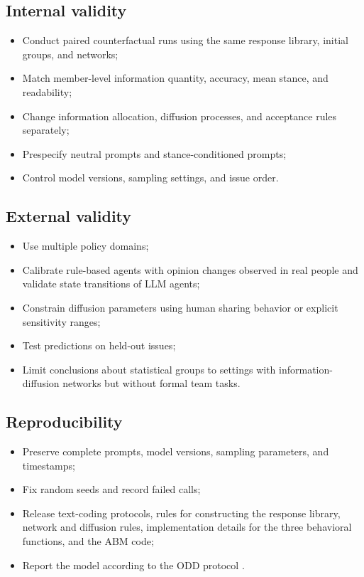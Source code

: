 \documentclass[11pt,a4paper]{article}
\begin{document}
\subsection{Internal validity}

\begin{itemize}
\item Conduct paired counterfactual runs using the same response library, initial groups, and networks;
\item Match member-level information quantity, accuracy, mean stance, and readability;
\item Change information allocation, diffusion processes, and acceptance rules separately;
\item Prespecify neutral prompts and stance-conditioned prompts;
\item Control model versions, sampling settings, and issue order.
\end{itemize}

\subsection{External validity}

\begin{itemize}
\item Use multiple policy domains;
\item Calibrate rule-based agents with opinion changes observed in real people and validate state transitions of LLM agents;
\item Constrain diffusion parameters using human sharing behavior or explicit sensitivity ranges;
\item Test predictions on held-out issues;
\item Limit conclusions about statistical groups to settings with information-diffusion networks but without formal team tasks.
\end{itemize}

\subsection{Reproducibility}

\begin{itemize}
\item Preserve complete prompts, model versions, sampling parameters, and timestamps;
\item Fix random seeds and record failed calls;
\item Release text-coding protocols, rules for constructing the response library, network and diffusion rules, implementation details for the three behavioral functions, and the ABM code;
\item Report the model according to the ODD protocol \cite{grimm2020}.
\end{itemize}
\end{document}
